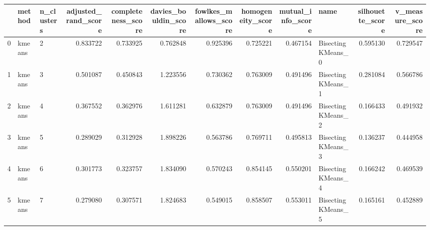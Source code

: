 \begin{tabular}{lllrrrrrrlrr}
\toprule
{} &  method & n\_clusters &  adjusted\_rand\_score &  completeness\_score &  davies\_bouldin\_score &  fowlkes\_mallows\_score &  homogeneity\_score &  mutual\_info\_score &                name &  silhouette\_score &  v\_measure\_score \\
\midrule
0 &  kmeans &          2 &             0.833722 &            0.733925 &              0.762848 &               0.925396 &           0.725221 &           0.467154 &  Bisecting KMeans\_0 &          0.595130 &         0.729547 \\
1 &  kmeans &          3 &             0.501087 &            0.450843 &              1.223556 &               0.730362 &           0.763009 &           0.491496 &  Bisecting KMeans\_1 &          0.281084 &         0.566786 \\
2 &  kmeans &          4 &             0.367552 &            0.362976 &              1.611281 &               0.632879 &           0.763009 &           0.491496 &  Bisecting KMeans\_2 &          0.166433 &         0.491932 \\
3 &  kmeans &          5 &             0.289029 &            0.312928 &              1.898226 &               0.563786 &           0.769711 &           0.495813 &  Bisecting KMeans\_3 &          0.136237 &         0.444958 \\
4 &  kmeans &          6 &             0.301773 &            0.323757 &              1.834090 &               0.570243 &           0.854145 &           0.550201 &  Bisecting KMeans\_4 &          0.166242 &         0.469539 \\
5 &  kmeans &          7 &             0.279080 &            0.307571 &              1.824683 &               0.549015 &           0.858507 &           0.553011 &  Bisecting KMeans\_5 &          0.165161 &         0.452889 \\
\bottomrule
\end{tabular}
